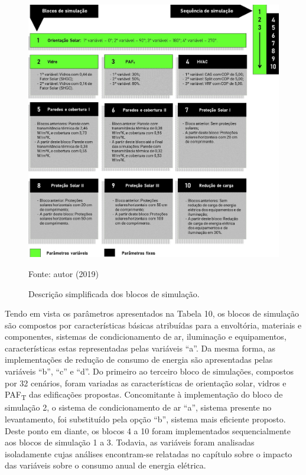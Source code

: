 \begin{figure}[H]
    \centering
    \caption{Descrição simplificada dos blocos de simulação.}
    \includegraphics[width=1.0\textwidth]{figures/fig13-fluxograma.jpg}
    \begin{flushleft}
        \par \small Fonte: autor (2019)
    \end{flushleft}
    \label{fig:figura13}
\end{figure}
\noindent Tendo em vista os parâmetros apresentados na Tabela 10, os blocos de simulação são compostos por características básicas atribuídas para a envoltória, materiais e componentes, sistemas de condicionamento de ar, iluminação e equipamentos, características estas representadas pelas variáveis “a”. Da mesma forma, as implementações de redução de consumo de energia são apresentadas pelas variáveis “b”, “c” e “d”.\vspace*{0.3cm} \newline
\noindent Do primeiro ao terceiro bloco de simulações, compostos por 32 cenários, foram variadas as características de orientação solar, vidros e PAF\textsubscript{T} das edificações propostas. Concomitante à implementação do bloco de simulação 2, o sistema de condicionamento de ar “a”, sistema presente no levantamento, foi substituído pela opção “b”, sistema mais eficiente proposto. Deste ponto em diante, os blocos 4 a 10 foram implementados sequencialmente aos blocos de simulação 1 a 3. Todavia, as variáveis foram analisadas isoladamente cujas análises encontram-se relatadas no capítulo sobre o impacto das variáveis sobre o consumo anual de energia elétrica.\vspace*{0.3cm} \newline
